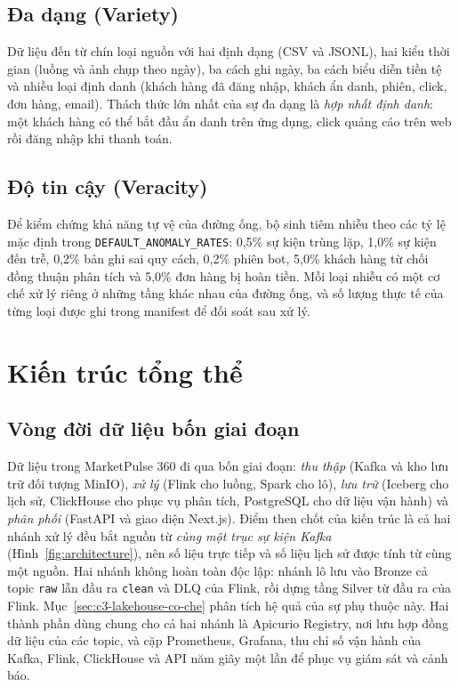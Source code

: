 \subsection{Đa dạng (Variety)}
\label{sec:c2-variety}
Dữ liệu đến từ chín loại nguồn với hai định dạng (CSV và JSONL), hai kiểu thời gian (luồng và ảnh chụp theo ngày), ba cách ghi ngày, ba cách biểu diễn tiền tệ và nhiều loại định danh (khách hàng đã đăng nhập, khách ẩn danh, phiên, click, đơn hàng, email). Thách thức lớn nhất của sự đa dạng là \emph{hợp nhất định danh}: một khách hàng có thể bắt đầu ẩn danh trên ứng dụng, click quảng cáo trên web rồi đăng nhập khi thanh toán.

\subsection{Độ tin cậy (Veracity)}
\label{sec:c2-veracity}
Để kiểm chứng khả năng tự vệ của đường ống, bộ sinh tiêm nhiễu theo các tỷ lệ mặc định trong \texttt{DEFAULT\_ANOMALY\_RATES}: 0,5\% sự kiện trùng lặp, 1,0\% sự kiện đến trễ, 0,2\% bản ghi sai quy cách, 0,2\% phiên bot, 5,0\% khách hàng từ chối đồng thuận phân tích và 5,0\% đơn hàng bị hoàn tiền. Mỗi loại nhiễu có một cơ chế xử lý riêng ở những tầng khác nhau của đường ống, và số lượng thực tế của từng loại được ghi trong manifest để đối soát sau xử lý.

\section{Kiến trúc tổng thể}
\label{sec:c2-kien-truc}

\subsection{Vòng đời dữ liệu bốn giai đoạn}
\label{sec:c2-vong-doi}
Dữ liệu trong MarketPulse 360 đi qua bốn giai đoạn: \emph{thu thập} (Kafka và kho lưu trữ đối tượng MinIO), \emph{xử lý} (Flink cho luồng, Spark cho lô), \emph{lưu trữ} (Iceberg cho lịch sử, ClickHouse cho phục vụ phân tích, PostgreSQL cho dữ liệu vận hành) và \emph{phân phối} (FastAPI và giao diện Next.js). Điểm then chốt của kiến trúc là cả hai nhánh xử lý đều bắt nguồn từ \emph{cùng một trục sự kiện Kafka} (Hình~\ref{fig:architecture}), nên số liệu trực tiếp và số liệu lịch sử được tính từ cùng một nguồn. Hai nhánh không hoàn toàn độc lập: nhánh lô lưu vào Bronze cả topic \texttt{raw} lẫn đầu ra \texttt{clean} và DLQ của Flink, rồi dựng tầng Silver từ đầu ra của Flink. Mục~\ref{sec:c3-lakehouse-co-che} phân tích hệ quả của sự phụ thuộc này. Hai thành phần dùng chung cho cả hai nhánh là Apicurio Registry, nơi lưu hợp đồng dữ liệu của các topic, và cặp Prometheus, Grafana, thu chỉ số vận hành của Kafka, Flink, ClickHouse và API năm giây một lần để phục vụ giám sát và cảnh báo.

